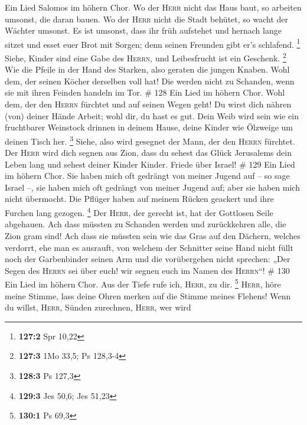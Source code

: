 Ein Lied Salomos im höhern Chor. Wo der \textsc{Herr}
nicht das Haus baut, so arbeiten umsonst, die daran bauen. Wo der
\textsc{Herr} nicht die Stadt behütet, so wacht der Wächter umsonst.
 Es ist umsonst, dass ihr früh aufstehet und hernach lange
sitzet und esset euer Brot mit Sorgen; denn seinen Freunden gibt er's
schlafend. \footnote{\textbf{127:2} Spr 10,22}  Siehe,
Kinder sind eine Gabe des \textsc{Herrn}, und Leibesfrucht ist ein
Geschenk. \footnote{\textbf{127:3} 1Mo 33,5; Ps 128,3-4} 
Wie die Pfeile in der Hand des Starken, also geraten die jungen Knaben.
 Wohl dem, der seinen Köcher derselben voll hat! Die
werden nicht zu Schanden, wenn sie mit ihren Feinden handeln im Tor. \#
128  Ein Lied im höhern Chor. Wohl dem, der den
\textsc{Herrn} fürchtet und auf seinen Wegen geht!  Du
wirst dich nähren (von) deiner Hände Arbeit; wohl dir, du hast es gut.
 Dein Weib wird sein wie ein fruchtbarer Weinstock drinnen
in deinem Hause, deine Kinder wie Ölzweige um deinen Tisch her.
\footnote{\textbf{128:3} Ps 127,3}  Siehe, also wird
gesegnet der Mann, der den \textsc{Herrn} fürchtet.  Der
\textsc{Herr} wird dich segnen aus Zion, dass du sehest das Glück
Jerusalems dein Leben lang  und sehest deiner Kinder
Kinder. Friede über Israel! \# 129  Ein Lied im höhern
Chor. Sie haben mich oft gedrängt von meiner Jugend auf -- so sage
Israel --,  sie haben mich oft gedrängt von meiner Jugend
auf; aber sie haben mich nicht übermocht.  Die Pflüger
haben auf meinem Rücken geackert und ihre Furchen lang gezogen.
\footnote{\textbf{129:3} Jes 50,6; Jes 51,23}  Der
\textsc{Herr}, der gerecht ist, hat der Gottlosen Seile abgehauen.
 Ach dass müssten zu Schanden werden und zurückkehren
alle, die Zion gram sind!  Ach dass sie müssten sein wie
das Gras auf den Dächern, welches verdorrt, ehe man es ausrauft,
 von welchem der Schnitter seine Hand nicht füllt noch der
Garbenbinder seinen Arm  und die vorübergehen nicht
sprechen: „Der Segen des \textsc{Herrn} sei über euch! wir segnen euch
im Namen des \textsc{Herrn}``! \# 130  Ein Lied im höhern
Chor. Aus der Tiefe rufe ich, \textsc{Herr}, zu dir. \footnote{\textbf{130:1}
  Ps 69,3}  \textsc{Herr}, höre meine Stimme, lass deine
Ohren merken auf die Stimme meines Flehens!  Wenn du
willst, \textsc{Herr}, Sünden zurechnen, \textsc{Herr}, wer wird
